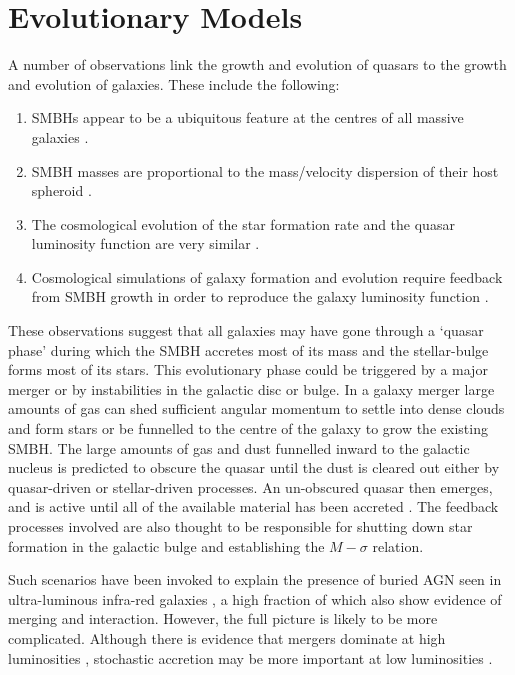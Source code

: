 \section{Evolutionary Models}

A number of observations link the growth and evolution of quasars to the growth and evolution of galaxies. These include the following: 

\begin{enumerate}
\item SMBHs appear to be a ubiquitous feature at the centres of all massive galaxies \citep[e.g.][]{kormendy13}. 
\item SMBH masses are proportional to the mass/velocity dispersion of their host spheroid \citep[the $M-\sigma$ relation;][]{ferrarese00,gebhardt00}.
\item The cosmological evolution of the star formation rate and the quasar luminosity function are very similar \citep[e.g.][]{wall05}.
\item Cosmological simulations of galaxy formation and evolution require feedback from SMBH growth in order to reproduce the galaxy luminosity function \citep{kauffmann00}.
\end{enumerate}

These observations suggest that all galaxies may have gone through a `quasar phase' during which the SMBH accretes most of its mass and the stellar-bulge forms most of its stars. This evolutionary phase could be triggered by a major merger or by instabilities in the galactic disc or bulge. In a galaxy merger large amounts of gas can shed sufficient angular momentum to settle into dense clouds and form stars or be funnelled to the centre of the galaxy to grow the existing SMBH. The large amounts of gas and dust funnelled inward to the galactic nucleus is predicted to obscure the quasar until the dust is cleared out either by quasar-driven or stellar-driven processes. An un-obscured quasar then emerges, and is active until all of the available material has been accreted \citep{hopkins06a, narayanan10}. The feedback processes involved are also thought to be responsible for shutting down star formation in the galactic bulge \citep{silk98} and establishing the $M-\sigma$ relation. 

Such scenarios have been invoked to explain the presence of buried AGN seen in ultra-luminous infra-red galaxies \citep[ULIRGs;][]{sanders88}, a high fraction of which also show evidence of merging and interaction. However, the full picture is likely to be more complicated. Although there is evidence that mergers dominate at high luminosities \citep{treister12}, stochastic accretion may be more important at low luminosities \citep[e.g.][]{hopkins06b}. 

